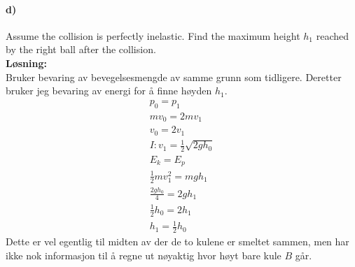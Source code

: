 \documentclass[11pt, A4paper,norsk]{article}
\begin{document}
		\paragraph{d)}
			\begin{flushleft}
Assume the collision is perfectly inelastic. Find the maximum height $h_1$ reached by the right ball after the collision. \\
\vspace{1mm}
\textbf{Løsning:} \\
\vspace{1mm}
Bruker bevaring av bevegelsesmengde av samme grunn som tidligere. Deretter bruker jeg bevaring av energi for å finne høyden $h_1$.
				\begin{align}
p_0 = p_1 \nonumber \\
mv_0 = 2mv_1 \nonumber \\
v_0 = 2v_1 \nonumber \\
I: v_1 = \frac{1}{2}\sqrt{2gh_0} \nonumber \\
E_k = E_p \nonumber \\
\frac{1}{2}mv_1^2 = mgh_1 \nonumber \\
\frac{2gh_0}{4} = 2gh_1 \nonumber \\
\frac{1}{2}h_0 = 2h_1 \nonumber \\
h_1 = \frac{1}{2}h_0 \nonumber
				\end{align}
Dette er vel egentlig til midten av der de to kulene er smeltet sammen, men har ikke nok informasjon til å regne ut nøyaktig hvor høyt bare kule $B$ går.
			\end{flushleft}
\end{document}
